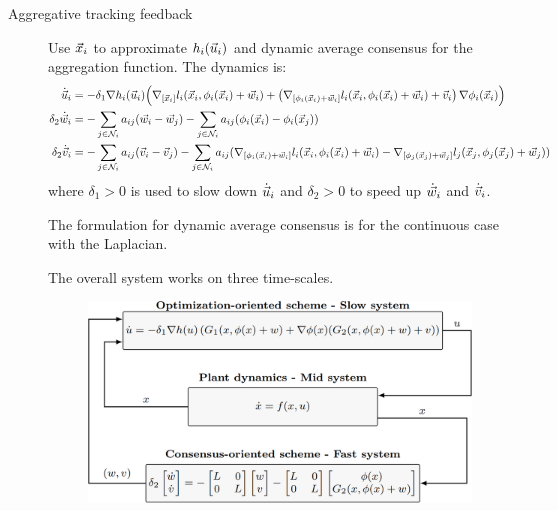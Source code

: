 \begin{description}
    \item[Aggregative tracking feedback] 
        Use ${\vec{x}}_i$ to approximate $h_i({\vec{u}}_i)$ and dynamic average consensus for the aggregation function. The dynamics is:
        \[
            \begin{split}
                \dot{{\vec{u}}}_i &= -\delta_1 \nabla h_i({\vec{u}}_i) \Big( \nabla_{[{\vec{x}}_i]} l_i({\vec{x}}_i, \phi_i({\vec{x}}_i)+{\vec{w}}_i) + \left( \nabla_{[\phi_i({\vec{x}}_i)+{\vec{w}}_i]} l_i({\vec{x}}_i, \phi_i({\vec{x}}_i)+{\vec{w}}_i) + {\vec{v}}_i \right) \nabla \phi_i({\vec{x}}_i) \Big) \\
                \delta_2 \dot{{\vec{w}}}_i &= - \sum_{j \in \mathcal{N}_i} a_{ij} ({\vec{w}}_i - {\vec{w}}_j) - \sum_{j \in \mathcal{N}_i} a_{ij} (\phi_i({\vec{x}}_i) - \phi_i({\vec{x}}_j)) \\
                \delta_2 \dot{{\vec{v}}}_i &= - \sum_{j \in \mathcal{N}_i} a_{ij} ({\vec{v}}_i - {\vec{v}}_j) - \sum_{j \in \mathcal{N}_i} a_{ij} (\nabla_{[\phi_i({\vec{x}}_i)+{\vec{w}}_i]} l_i({\vec{x}}_i, \phi_i({\vec{x}}_i)+{\vec{w}}_i) - \nabla_{[\phi_j({\vec{x}}_j)+{\vec{w}}_j]} l_j({\vec{x}}_j, \phi_j({\vec{x}}_j)+{\vec{w}}_j)) \\
            \end{split}
        \]
        where $\delta_1 > 0$ is used to slow down $\dot{{\vec{u}}}_i$ and $\delta_2 > 0$ to speed up $\dot{{\vec{w}}}_i$ and $\dot{{\vec{v}}}_i$.

        \begin{remark}
            The formulation for dynamic average consensus is for the continuous case with the Laplacian.
        \end{remark}

        \begin{remark}
            The overall system works on three time-scales.
            \begin{figure}[H]
                \centering
                \includegraphics[width=0.6\linewidth]{./img/feedback_distributed.png}
            \end{figure}
        \end{remark}
\end{description}


